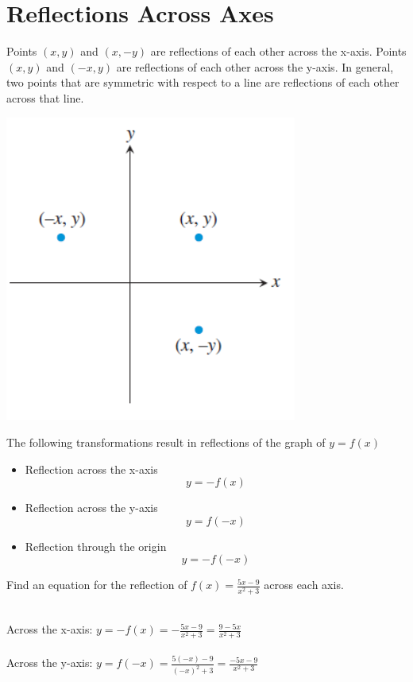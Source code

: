 \documentclass[handout, noauthor, nooutcomes]{ximera}
\begin{document}
\section{Reflections Across Axes}
Points $(x,y)$ and $(x,-y)$ are reflections of each other across the x-axis. Points $(x, y)$ and $(-x, y)$ are reflections of each other across the y-axis. In general, two points that are symmetric with respect to a line are reflections of each other across that line.
\begin{image}
\includegraphics[]{images/reflectiongraph}
\end{image}
\begin{callout}
The following transformations result in reflections of the graph of $y = f(x)$
\begin{itemize}
\item Reflection across the x-axis
\[
y=-f(x)
\]
\item Reflection across the y-axis
\[
y=f(-x)
\]
\item Reflection through the origin
\[
y=-f(-x)
\]
\end{itemize}
\end{callout}
\begin{example}
Find an equation for the reflection of $f(x) = \frac{5x - 9}{x^2+3}$ across each axis.
\\
\begin{explanation}\\
Across the x-axis: $y = -f(x) = -\frac{5x-9}{x^2+3}=\frac{9-5x}{x^2+3}$\\
\\
Across the y-axis: $y = f(-x) = \frac{5(-x)-9}{(-x)^2+3}=\frac{-5x-9}{x^2+3}$
\end{explanation}
\end{example}
\end{document}
